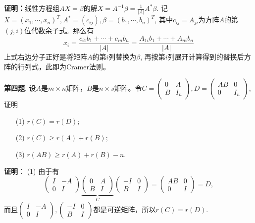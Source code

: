 \ifIncludeAnswer

\newpageorvspace

{\bf 证明：}线性方程组$AX=\beta$的解$X = A^{-1}\beta = \frac{1}{|A|}A^*\beta$. 记$X = (x_1, \cdots, x_n)^T, A^* = (c_{ij}), \beta = (b_1, \cdots, b_n)^T$, 其中$c_{ij} = A_{ji}$为方阵$A$的第$(j,i)$位代数余子式。那么有
$$x_i = \frac{c_{i1}b_1 + \cdots + c_{in}b_n}{|A|} = \frac{A_{1i}b_1 + \cdots + A_{ni}b_n}{|A|}$$
上式右边分子正好是将矩阵$A$的第$i$列替换为$\beta$, 再按第$i$列展开计算得到的替换后方阵的行列式，此即为Cramer法则。

\fi  %

\newpageorvspace

{\bf 第四题}. 设$A$是$m\times n$矩阵，$B$是$n\times s$矩阵。令$C = \begin{pmatrix} 0 & A \\ B & I_n \end{pmatrix}, D = \begin{pmatrix} AB & 0 \\ 0 & I_n \end{pmatrix},$ 证明
\begin{itemize}
\item[(1)] $r(C) = r(D);$
\item[(2)] $r(C) \geqslant r(A) + r(B);$
\item[(3)] $r(AB) \geqslant r(A) + r(B) - n.$
\end{itemize}

\ifIncludeAnswer

\newpageorvspace

{\bf 证明}： (1) 由于有
$$\begin{pmatrix} I & -A \\ 0 & I \end{pmatrix} \underbrace{\begin{pmatrix} 0 & A \\ B & I \end{pmatrix}}_{C} \begin{pmatrix} -I & 0 \\ B & I \end{pmatrix} = \begin{pmatrix} AB & 0 \\ 0 & I \end{pmatrix} = D,$$
而且$\begin{pmatrix} I & -A \\ 0 & I \end{pmatrix}, \begin{pmatrix} -I & 0 \\ B & I \end{pmatrix}$都是可逆矩阵，所以$r(C) = r(D).$

